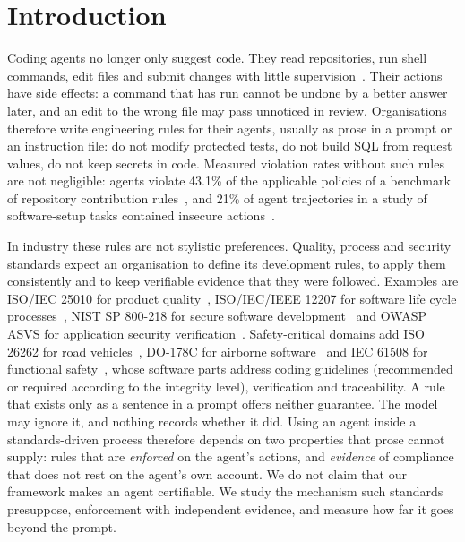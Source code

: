 \documentclass[conference]{IEEEtran}
\begin{document}
\section{Introduction}
Coding agents no longer only suggest code. They read repositories, run shell commands, edit files and submit changes with little supervision~\cite{sweagent}.
Their actions have side effects: a command that has run cannot be undone by a better answer later, and an edit to the wrong file may pass unnoticed in review.
Organisations therefore write engineering rules for their agents, usually as prose in a prompt or an instruction file: do not modify protected tests, do not build SQL from request values, do not keep secrets in code.
Measured violation rates without such rules are not negligible: agents violate 43.1\% of the applicable policies of a benchmark of repository contribution rules~\cite{swecc}, and 21\% of agent trajectories in a study of software-setup tasks contained insecure actions~\cite{securitydebt}.

In industry these rules are not stylistic preferences. Quality, process and security standards expect an organisation to define its development rules, to apply them consistently and to keep verifiable evidence that they were followed.
Examples are ISO/IEC 25010 for product quality~\cite{iso25010}, ISO/IEC/IEEE 12207 for software life cycle processes~\cite{iso12207}, NIST SP 800-218 for secure software development~\cite{nistssdf} and OWASP ASVS for application security verification~\cite{asvs}.
Safety-critical domains add ISO 26262 for road vehicles~\cite{iso26262}, DO-178C for airborne software~\cite{do178c} and IEC 61508 for functional safety~\cite{iec61508}, whose software parts address coding guidelines (recommended or required according to the integrity level), verification and traceability.
A rule that exists only as a sentence in a prompt offers neither guarantee. The model may ignore it, and nothing records whether it did.
Using an agent inside a standards-driven process therefore depends on two properties that prose cannot supply: rules that are \emph{enforced} on the agent's actions, and \emph{evidence} of compliance that does not rest on the agent's own account.
We do not claim that our framework makes an agent certifiable. We study the mechanism such standards presuppose, enforcement with independent evidence, and measure how far it goes beyond the prompt.
\end{document}
